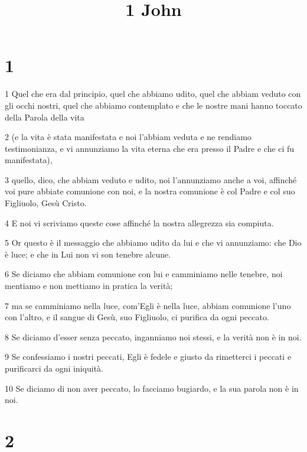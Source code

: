 

\title{1 John}


\chapter{1}

\par 1 Quel che era dal principio, quel che abbiamo udito, quel che abbiam veduto con gli occhi nostri, quel che abbiamo contemplato e che le nostre mani hanno toccato della Parola della vita
\par 2 (e la vita è stata manifestata e noi l'abbiam veduta e ne rendiamo testimonianza, e vi annunziamo la vita eterna che era presso il Padre e che ci fu manifestata),
\par 3 quello, dico, che abbiam veduto e udito, noi l'annunziamo anche a voi, affinché voi pure abbiate comunione con noi, e la nostra comunione è col Padre e col suo Figliuolo, Gesù Cristo.
\par 4 E noi vi scriviamo queste cose affinché la nostra allegrezza sia compiuta.
\par 5 Or questo è il messaggio che abbiamo udito da lui e che vi annunziamo: che Dio è luce; e che in Lui non vi son tenebre alcune.
\par 6 Se diciamo che abbiam comunione con lui e camminiamo nelle tenebre, noi mentiamo e non mettiamo in pratica la verità;
\par 7 ma se camminiamo nella luce, com'Egli è nella luce, abbiam comunione l'uno con l'altro, e il sangue di Gesù, suo Figliuolo, ci purifica da ogni peccato.
\par 8 Se diciamo d'esser senza peccato, inganniamo noi stessi, e la verità non è in noi.
\par 9 Se confessiamo i nostri peccati, Egli è fedele e giusto da rimetterci i peccati e purificarci da ogni iniquità.
\par 10 Se diciamo di non aver peccato, lo facciamo bugiardo, e la sua parola non è in noi.

\chapter{2}

